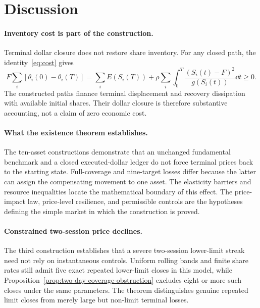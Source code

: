 \documentclass[review,hidelinks,onefignum,onetabnum]{siamonline250211}
\begin{document}
\section{Discussion}\label{sec:discussion}
\paragraph{Inventory cost is part of the construction.}
Terminal dollar closure does not restore share inventory. For any closed path, the identity~\eqref{eq:cost} gives
\begin{equation}\label{eq:inventory-discussion}
 F\sum_i[\theta_i(0)-\theta_i(T)]
 =\sum_i E(S_i(T))
  +\rho\sum_i\int_0^T\frac{(S_i(t)-F)^2}{g(S_i(t))}\dd t\ge0.
\end{equation}
The constructed paths finance terminal displacement and recovery dissipation with available initial shares. Their dollar closure is therefore substantive accounting, not a claim of zero economic cost.

\paragraph{What the existence theorem establishes.}
The ten-asset constructions demonstrate that an unchanged fundamental benchmark and a closed executed-dollar ledger do not force terminal prices back to the starting state. Full-coverage and nine-target losses differ because the latter can assign the compensating movement to one asset. The elasticity barriers and resource inequalities locate the mathematical boundary of this effect. The price-impact law, price-level resilience, and permissible controls are the hypotheses defining the simple market in which the construction is proved.

\paragraph{Constrained two-session price declines.}
The third construction establishes that a severe two-session lower-limit streak need not rely on instantaneous controls. Uniform rolling bands and finite share rates still admit five exact repeated lower-limit closes in this model, while Proposition~\ref{prop:two-day-coverage-obstruction} excludes eight or more such closes under the same parameters. The theorem distinguishes genuine repeated limit closes from merely large but non-limit terminal losses.
\end{document}
